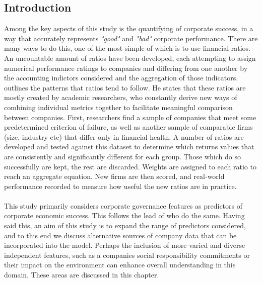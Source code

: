 \subsection{Introduction}
{Among the key aspects of this study is the quantifying of corporate success, in a way that accurately represents {\it "good"} and {\it "bad"} corporate performance. There are many ways to do this, one of the most simple of which is to use financial ratios. An uncountable amount of ratios have been developed, each attempting to assign numerical performance ratings to companies and differing from one another by the accounting indictors considered and the aggregation of those indicators. \cite {eidleman1995z} outlines the patterns that ratios tend to follow. He states that these ratios are mostly created by academic researchers, who constantly derive new ways of combining individual metrics together to facilitate meaningful comparison between companies. First, researchers find a sample of companies that meet some predetermined criterion of failure, as well as another sample of comparable firms (size, industry etc) that differ only in financial health. A number of ratios are developed and tested against this dataset to determine which returns values that are consistently and significantly different for each group. Those which do so successfully are kept, the rest are discarded. Weights are assigned to each ratio to reach an aggregate equation. New firms are then scored, and real-world performance recorded to measure how useful the new ratios are in practice. \\\\
This study primarily considers corporate governance features as predictors of corporate economic success. This follows the lead of \cite{moldovan2015learning} who do the same. Having said this, an aim of this study is to expand the range of predictors considered, and to this end we discuss alternative sources of company data that can be incorporated into the model. Perhaps the inclusion of more varied and diverse independent features, such as a companies social responsibility commitments or their impact on the environment can enhance overall understanding in this domain. These areas are discussed in this chapter.    }

